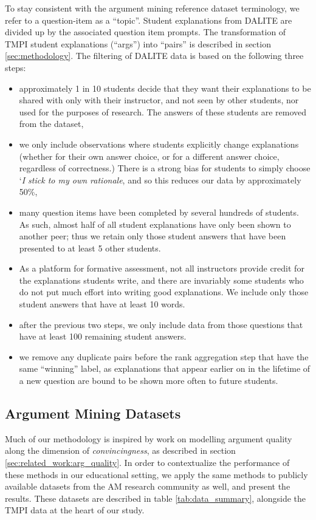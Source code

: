 \documentclass[notitlepage,12pt]{jedm}
\begin{document}
To stay consistent with the argument mining reference dataset terminology, we 
refer to a question-item as a ``topic''.
Student explanations from DALITE are divided up by the associated question item 
prompts.
The transformation of TMPI student explanations (``args'') into ``pairs'' is 
described in section \ref{sec:methodology}. 
The filtering of DALITE data is based on the following three steps:
\begin{itemize}
	\item approximately 1 in 10 students decide that they want their 
	explanations to be shared with only with their instructor, and not seen by 
	other students, nor used for the purposes of research.
	The answers of these students are removed from the dataset, 
	\item we only include observations where students explicitly 
	change explanations (whether for their own answer choice, or for a 
	different answer choice, regardless of correctness.) 
	There is a strong bias for students to simply choose `\textit{I stick to my 
	own rationale}, and so this reduces our data by approximately 50\%,
	\item many question items have been completed by several hundreds of 
	students.
	As such, almost half of all student explanations have only been shown to 
	another peer; thus we retain only those student answers that have been 
	presented to at least 5 other students.
	\item As a platform for formative assessment, not all instructors provide 
	credit for the explanations students write, and there are invariably some 
	students who do not put much effort into writing good explanations.
	We include only those student answers that have at least 10 words.
	\item after the previous two steps, we only include data from those 
	questions that have at least 100 remaining student answers.
	\item we remove any duplicate pairs before the rank aggregation step that 
	have the same ``winning'' label, as explanations that appear earlier on in 
	the lifetime of a new question are bound to be shown more often to future 
	students.
\end{itemize}


\subsection{Argument Mining Datasets}
Much of our methodology is inspired by work on modelling argument quality along 
the dimension of \textit{convincingness}, as described in section 
\ref{sec:related_work:arg_quality}. 
In order to contextualize the performance of these methods in our educational 
setting, we apply the same methods to publicly available datasets from the 
AM research community as well, and present the results. 
These datasets are described in table \ref{tab:data_summary}, alongside the 
TMPI data at the heart of our study. 
\end{document}
